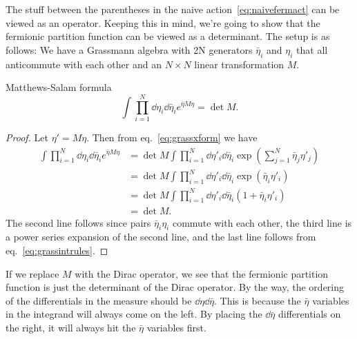 The stuff between the parentheses in the naive action~\eqref{eq:naivefermact}
can be viewed as an operator. Keeping this in mind, we're going to show
that the fermionic partition function can be viewed as a determinant.
The setup is as follows: We have a Grassmann algebra with 2N generators
$\bar{\eta}_i$ and $\eta_i$ that all anticommute with each other and
an $N\times N$ linear transformation $M$.
\begin{theorem}{Matthews-Salam formula}{}
$$
  \int\prod_{i=1}^N\dd{\eta_i}\dd{\bar{\eta}_i}e^{\bar{\eta}M\eta}=\det M.
$$
\begin{proof} Let $\eta'=M\eta$. Then from eq.~\eqref{eq:grassxform}
  we have
  \begin{equation*}\begin{aligned}
  \int \prod_{i=1}^N\dd{\eta_i}\dd{\bar{\eta}_i}e^{\bar{\eta}M\eta}
    &=\det M\int \prod_{i=1}^N\dd{\eta'_i}\dd{\bar{\eta}_i}
       \exp\left(\sum_{j=1}^N\bar{\eta}_j\eta'_j\right)\\
    &=\det M\int \prod_{i=1}^N\dd{\eta'_i}\dd{\bar{\eta}_i}
       \exp\left(\bar{\eta}_i\eta'_i\right)\\
    &=\det M\int \prod_{i=1}^N\dd{\eta'_i}\dd{\bar{\eta}_i}
        (1+\bar{\eta}_i\eta'_i)\\
    &=\det M.
  \end{aligned}\end{equation*}
  The second line follows since pairs $\bar{\eta}_i\eta_i$ commute with
  each other, the third line is a power series expansion of the second
  line, and the last line follows from eq.~\eqref{eq:grassintrules}.
\end{proof}
\end{theorem}
If we replace $M$ with the Dirac operator, we see that the fermionic
partition function is just the determinant of the Dirac operator.
By the way, the ordering of the differentials in the measure should
be $\dd{\eta}\dd{\bar{\eta}}$. This is because the $\bar{\eta}$ variables
in the integrand will always come on the left. By placing the
$\dd{\bar{\eta}}$ differentials on the right, it will always hit the
$\bar{\eta}$ variables first.

